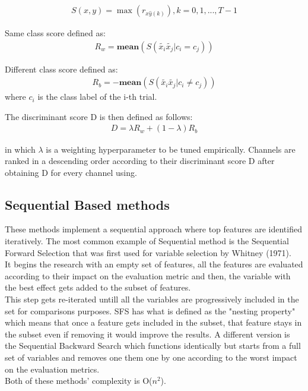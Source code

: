 \documentclass{Configuration_Files/PoliMi3i_thesis}
\begin{document}
\begin{align}
	S(x,y) = \max(r_{x\hat{y}(k)}), k=0,1,..., T - 1 
   \label{eq:XCDC_01}
\end{align}

Same class score defined as:
\begin{align}
	R_w = \mathbf{mean}(S(\tilde{x_i}\tilde{x_j}| c_i = c_j))
   \label{eq:XCDC4}
\end{align}

Different class score defined as:
\begin{align}
	R_b = -\mathbf{mean}(S(\tilde{x_i}\tilde{x_j}| c_i \neq  c_j))
   \label{eq:XCDC5}
\end{align}
where $c_i$ is the class label of the i-th trial.

The discriminant score D is then defined as follows:
\begin{align}
	D = \lambda R_w + (1-\lambda)R_b
   \label{eq:XCDC6_1}
\end{align}

in which $\lambda$ is a weighting hyperparameter to be tuned empirically.
Channels are ranked in a descending order according to their discriminant score D after obtaining D for every channel using.


\subsection{Sequential Based methods}

These methods implement a sequential approach where top features are identified iteratively.
The most common example of Sequential method is the Sequential Forward Selection that was first used for variable selection by Whitney (1971). \\
It begins the research with an empty set of features, all the features are evaluated according to their impact on the evaluation metric and then, the variable with the best effect gets added to the subset of features. \\
This step gets re-iterated untill all the variables are progressively included in the set for comparisons purposes.
SFS has what is defined as the "nesting property" which means that once a feature gets included in the subset, that feature stays in the subset even if removing it would improve the results.  \cite{reunanenOverfittingMakingComparisons}
A different version is the Sequential Backward Search which functions identically but starts from a full set of variables and removes one them one by one according to the worst impact on the evaluation metrics. \cite{pudilFloatingSearchMethods1994} \\
Both of these methods' complexity is O($n^2$). \cite{kudoComparisonAlgorithmsThat2000}
\end{document}
